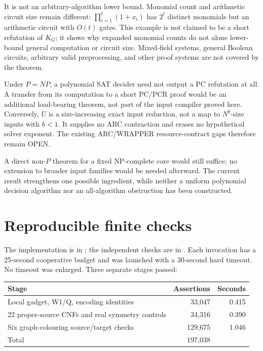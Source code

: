 \documentclass[11pt]{article}
\begin{document}
It is not an arbitrary-algorithm lower bound. Monomial count and arithmetic
circuit size remain different: $\prod_{i=1}^t(1+x_i)$ has $2^t$ distinct
monomials but an arithmetic circuit with $O(t)$ gates. This example is not
claimed to be a short refutation of $K_G$; it shows why expanded monomial
counts do not alone lower-bound general computation or circuit size.
Mixed-field systems, general Boolean circuits, arbitrary valid preprocessing,
and other proof systems are not covered by the theorem.

Under $P=NP$, a polynomial SAT decider need not output a PC refutation at all.
A transfer from its computation to a short PC/PCR proof would be an additional
load-bearing theorem, not part of the input compiler proved here. Conversely,
$U$ is a size-increasing exact input reduction, not a map to $N^b$-size inputs
with $b<1$. It supplies no ARC contraction and erases no hypothetical solver
exponent. The existing ARC/WRAPPER resource-contract gaps therefore remain
OPEN.

A direct non-$P$ theorem for a fixed NP-complete core would still suffice;
no extension to broader input families would be needed afterward. The current
result strengthens one possible ingredient, while neither a uniform
polynomial decision algorithm nor an all-algorithm obstruction has been
constructed.

\section{Reproducible finite checks}
The implementation is in ; the independent
checks are in . Each invocation has a
25-second cooperative budget and was launched with a 30-second hard timeout.
No timeout was enlarged. Three separate stages passed:
\begin{center}
\begin{tabular}{lrr}
\toprule
Stage & Assertions & Seconds\\
\midrule
Local gadget, W1/Q, encoding identities & 33,047 & 0.415\\
22 proper-source CNFs and real symmetry controls & 34,316 & 0.390\\
Six graph-colouring source/target checks & 129,675 & 1.046\\
\midrule
Total & 197,038 & \\
\bottomrule
\end{tabular}
\end{center}
\end{document}
